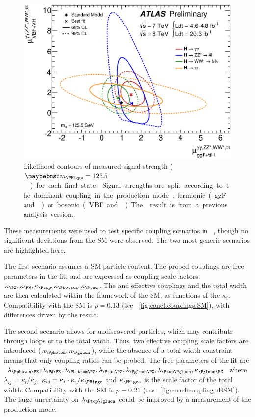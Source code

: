 \begin{figure}[t]
	\includegraphics[width=\largefigwidth]{tex/conclusions/atlas_mu_2D}
	\caption{Likelihood contours of measured signal strength (\unit{$\mH = 125.5$}{\GeV}) 
	for each final state \cite{ATLAS:couplings:Moriond14}. Signal strengths are split 
	according to the dominant coupling in the production mode: fermionic (ggF and \ttH) 
	or bosonic (VBF and \VH). The \HWW result is from a previous analysis version.}
	\label{fig:concl:mu_2D}
\end{figure}

These measurements were used to test specific coupling scenarios in 
\Reference~\cite{ATLAS:couplings:Moriond14}, though no significant deviations from the SM 
were observed. The two most generic scenarios are highlighted here. 

The first scenario assumes a SM particle content. The probed couplings are free 
parameters in the fit, and are expressed as coupling scale factors: 
$\kappa_{\PZ}, \kappa_{\PW}, \kappa_{\Ptop}, \kappa_{\Pbottom}, \kappa_{\Ptau}$. The 
\HepProcess{\PHiggs\Pphoton\Pphoton} and \HepProcess{\PHiggs\Pgluon\Pgluon} effective 
couplings and the total width are then calculated within the framework of the SM, as 
functions of the $\kappa_i$. Compatibility with the SM is $p = 0.13$ (see 
\Figure~\ref{fig:concl:couplings:SM}), with differences driven by the 
\HepProcess{\PHiggs \HepTo \Pbottom\APbottom} result.

The second scenario allows for undiscovered particles, which may contribute through loops 
or to the total width. Thus, two effective coupling scale factors are introduced 
($\kappa_{\Pphoton}, \kappa_{\Pgluon}$), while the absence of a total width constraint 
means that only coupling ratios can be probed. The free parameters of the fit are 
$\lambda_{\Pphoton\PZ}, \lambda_{\PW\PZ}, \lambda_{\Pbottom\PZ}, \lambda_{\Ptau\PZ}, 
\lambda_{\Pgluon\PZ}, \lambda_{\Ptop\Pgluon}, \kappa_{\Pgluon\PZ}$ where 
$\lambda_{ij} = \kappa_i / \kappa_j$, $\kappa_{ij} = \kappa_i \cdot \kappa_j / 
\kappa_{\PHiggs}$ and $\kappa_{\PHiggs}$ is the scale factor of the total width. 
Compatibility with the SM is $p = 0.21$ (see \Figure~\ref{fig:concl:couplings:BSM}). The 
large uncertainty on $\lambda_{\Ptop\Pgluon}$ could be improved by a measurement of the 
\ttH production mode.

